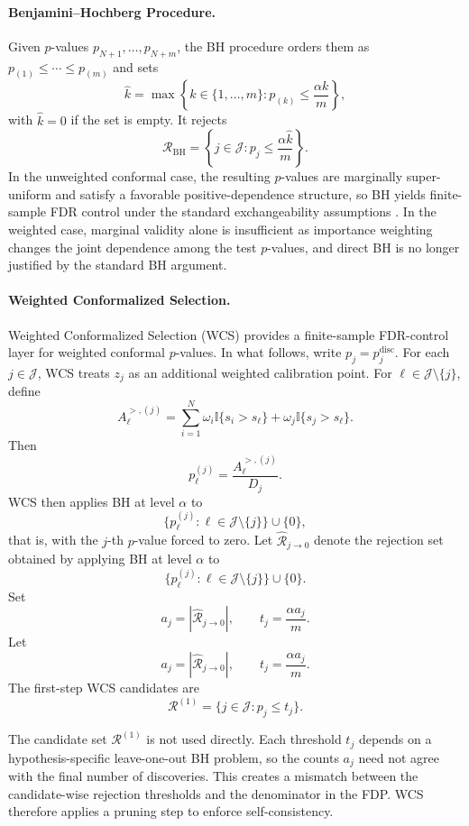\paragraph{Benjamini--Hochberg Procedure.}
Given \(p\)-values \(p_{N+1},\ldots,p_{N+m}\), the
BH procedure \cite{Hochberg1995} orders them as
\(p_{(1)}\le\cdots\le p_{(m)}\) and sets
\[
    \widehat{k}
    =
    \max\left\{
        k\in\{1,\ldots,m\}:
        p_{(k)}\le \frac{\alpha k}{m}
    \right\},
\]
with \(\widehat{k}=0\) if the set is empty. It rejects
\[
    \mathcal{R}_{\mathrm{BH}}
    =
    \left\{
        j\in\mathcal{J}:
        p_j\le \frac{\alpha\widehat{k}}{m}
    \right\}.
\]
In the unweighted conformal case, the resulting \(p\)-values are marginally
super-uniform and satisfy a favorable positive-dependence structure, so BH
yields finite-sample FDR control under the standard exchangeability
assumptions \cite{Bates2023}. In the weighted case, marginal validity alone
is insufficient as importance weighting changes the joint dependence among the
test \(p\)-values, and direct BH is no longer justified by the standard BH
argument.

\paragraph{Weighted Conformalized Selection.}
Weighted Conformalized Selection (WCS) \cite{Jin2025} provides a
finite-sample FDR-control layer for weighted conformal \(p\)-values. In what
follows, write \(p_j=p_j^{\mathrm{disc}}\). For each \(j\in\mathcal{J}\), WCS treats \(z_j\) as an additional
weighted calibration point. For \(\ell\in\mathcal{J}\setminus\{j\}\), define
\[
    A_{\ell}^{>,(j)}
    =
    \sum_{i=1}^{N}\omega_i\mathbb{I}\{s_i>s_\ell\}
    +
    \omega_j\mathbb{I}\{s_j>s_\ell\}.
\]
Then
\[
    p_\ell^{(j)}
    =
    \frac{A_{\ell}^{>,(j)}}{D_j}.
\]
WCS then applies BH at level \(\alpha\) to
\[
    \{p_\ell^{(j)}:\ell\in\mathcal{J}\setminus\{j\}\}\cup\{0\},
\]
that is, with the \(j\)-th \(p\)-value forced to zero. Let \(\widehat{\mathcal{R}}_{j\to0}\) denote the rejection set obtained by
applying BH at level \(\alpha\) to
\[
    \{p_\ell^{(j)}:\ell\in\mathcal{J}\setminus\{j\}\}\cup\{0\}.
\]
Set
\[
    a_j=|\widehat{\mathcal{R}}_{j\to0}|,
    \qquad
    t_j=\frac{\alpha a_j}{m}.
\]
Let
\[
    a_j=|\widehat{\mathcal{R}}_{j\to0}|,
    \qquad
    t_j=\frac{\alpha a_j}{m}.
\]
The first-step WCS candidates are
\[
    \mathcal{R}^{(1)}
    =
    \{j\in\mathcal{J}:p_j\le t_j\}.
\]

The candidate set \(\mathcal{R}^{(1)}\) is not used directly. Each threshold
\(t_j\) depends on a hypothesis-specific leave-one-out BH problem, so the
counts \(a_j\) need not agree with the final number of discoveries. This
creates a mismatch between the candidate-wise rejection thresholds and the
denominator in the FDP. WCS therefore applies a pruning step to enforce
self-consistency.

